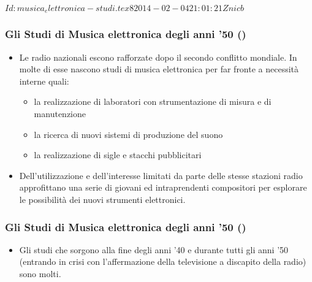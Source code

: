 %
%
\svnInfo $Id: musica_elettronica-studi.tex 8 2014-02-04 21:01:21Z nicb $

\newcommand{\sem}{\emph{Studio f\"ur Elektronische Musik}\xspace}
\newcommand{\sfm}{\emph{Studi di Fonologia Musicale}\xspace}

\setcounter{ms}{0}
\begin{frame}
    \frametitle{\normalsize Gli Studi di Musica elettronica degli anni '50 ()}

    \begin{itemize}

        \item Le radio nazionali
            escono rafforzate dopo il secondo conflitto mondiale.
            In molte di esse nascono studi di musica elettronica
            per far fronte a necessit\`a interne quali:

            \begin{itemize}

                \item la realizzazione di laboratori con strumentazione di misura e di manutenzione

                \item la ricerca di nuovi sistemi di produzione del suono

                \item la realizzazione di sigle e stacchi pubblicitari

            \end{itemize}

        \item Dell'utilizzazione e dell'interesse limitati
            da parte delle stesse stazioni radio
            approfittano una serie di giovani ed intraprendenti compositori
            per esplorare le possibilit\`a dei nuovi strumenti elettronici.

    \end{itemize}

\end{frame}

\begin{frame}
    \frametitle{\normalsize Gli Studi di Musica elettronica degli anni '50 ()}

    \begin{itemize}

        \item Gli studi che sorgono alla fine degli anni '40 e durante tutti gli anni '50
            (entrando in crisi con l'affermazione della televisione
            a discapito della radio) sono molti.

    \end{itemize}

\end{frame}

